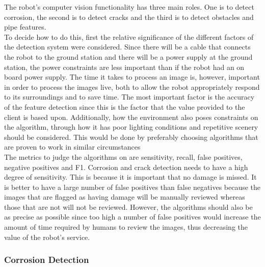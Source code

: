 \documentclass[11pt]{article}		%
\begin{document}
			The robot’s computer vision functionality has three main roles. 
			One is to detect corrosion, the second is to detect cracks and the third is to detect obstacles and pipe features.
			\\
	        To decide how to do this, first the relative significance of the different factors of the detection system were considered. 
	        Since there will be a cable that connects the robot to the ground station and there will be a power supply at the ground station, the power constraints are less important than if the robot had an on board power supply. 
	        The time it takes to process an image is, however, important in order to process the images live, both to allow the robot appropriately respond to its surroundings and to save time. 
	        The most important factor is the accuracy of the feature detection since this is the factor that the value provided to the client is based upon.
	        Additionally, how the environment also poses constraints on the algorithm, through how it has poor lighting conditions and repetitive scenery should be considered. This would be done by preferably choosing algorithms that are proven to work in similar circumstances
	        \\
	        The metrics to judge the algorithms on are sensitivity, recall, false positives, negative positives and F1.
	        Corrosion and crack detection needs to have a high degree of sensitivity. 
	        This is because it is important that no damage is missed. 
	        It is better to have a large number of false positives than false negatives because the images that are flagged as having damage will be manually reviewed whereas those that are not will not be reviewed. 
	        However, the algorithms should also be as precise as possible since too high a number of false positives would increase the amount of time required by humans to review the images, thus decreasing the value of the robot’s service.
        
        \subsubsection{Corrosion Detection}
\end{document}
